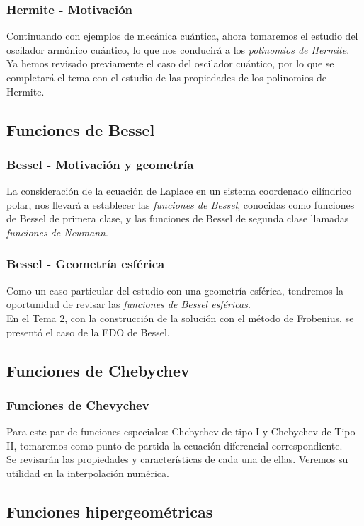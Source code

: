 \documentclass[12pt]{beamer}
\begin{document}
\begin{frame}
\frametitle{Hermite - Motivación}
Continuando con ejemplos de mecánica cuántica, ahora tomaremos el estudio del oscilador armónico cuántico, lo que nos conducirá a los \emph{polinomios de Hermite}.
\\
\bigskip
\pause
Ya hemos revisado previamente el caso del oscilador cuántico, por lo que se completará el tema con el estudio de las propiedades de los polinomios de Hermite.
\end{frame}

\subsection{Funciones de Bessel}

\begin{frame}
\frametitle{Bessel - Motivación y geometría}
La consideración de la ecuación de Laplace en un sistema coordenado cilíndrico polar, nos llevará a establecer las \emph{funciones de Bessel}, conocidas como funciones de Bessel de primera clase, y las funciones de Bessel de segunda clase llamadas \emph{funciones de Neumann}.
\end{frame}
\begin{frame}
\frametitle{Bessel - Geometría esférica}
Como un caso particular del estudio con una geometría esférica, tendremos la oportunidad de revisar las \emph{funciones de Bessel esféricas}.
\\
\bigskip
En el Tema 2, con la construcción de la solución con el método de Frobenius, se presentó el caso de la EDO de Bessel.
\end{frame}

\subsection{Funciones de Chebychev}

\begin{frame}
\frametitle{Funciones de Chevychev}
Para este par de funciones especiales: Chebychev de tipo I y Chebychev de Tipo II, tomaremos como punto de partida la ecuación diferencial correspondiente.
\\
\bigskip
\pause
Se revisarán las propiedades y características de cada una de ellas. Veremos su utilidad en la interpolación numérica.
\end{frame}

\subsection{Funciones hipergeométricas}
\end{document}
